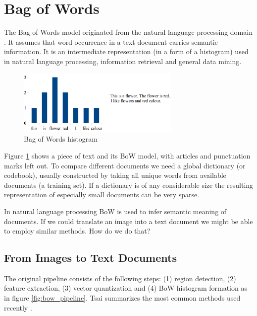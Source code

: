 \documentclass[12pt]{article}
\begin{document}
\section{ Bag of Words }

  The Bag of Words model originated from the natural language processing domain 
\cite{tsai2012bag}. It 
assumes that word occurrence in a text document carries semantic information. 
It is an intermediate representation (in a form of a histogram)
used in natural language processing, information retrieval and general data 
mining. 

  \begin{figure}[!ht]
  \centering
  \includegraphics[width=0.7\textwidth]{figs/bow_example}
  \caption{Bag of Words histogram}
  \label{fig:bow_example}
  \end{figure}

  Figure \ref{fig:bow_example} shows a piece of text and its BoW model, with 
articles and punctuation marks left out. To compare different 
documents we need a global dictionary (or codebook), usually constructed by 
taking all unique words from available documents (a training set). If 
a dictionary is of any considerable size the resulting representation of 
especially small documents can be very sparse.

  In natural language processing BoW is used to infer semantic meaning of 
documents. If we could translate an image into a text document we might be able 
to employ similar methods. How do we do that?

  \subsection{From Images to Text Documents}	
The original pipeline consists of the following 
steps: (1) region detection, (2) feature extraction, (3) vector quantization 
and (4) BoW histogram formation as in figure \ref{fig:bow_pipeline}. Tsai 
summarizes the most common methods used recently \cite{tsai2012bag}. 
\end{document}
